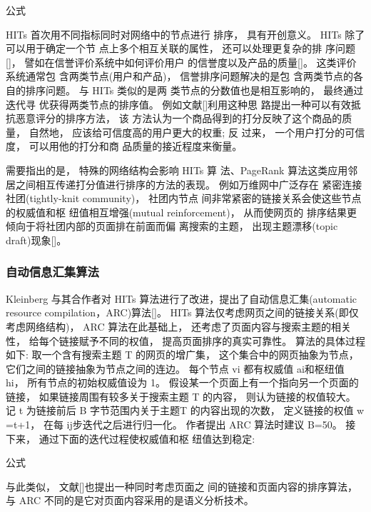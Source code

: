 				公式

				HITs 首次用不同指标同时对网络中的节点进行 排序， 具有开创意义。 HITs 除了可以用于确定一个节 点上多个相互关联的属性， 还可以处理更复杂的排 序问题[]， 譬如在信誉评价系统中如何评价用户 的信誉度以及产品的质量[]。 这类评价系统通常包 含两类节点(用户和产品)， 信誉排序问题解决的是包 含两类节点的各自的排序问题。 与 HITs 类似的是两 类节点的分数值也是相互影响的， 最终通过迭代寻 优获得两类节点的排序值。 例如文献[]利用这种思 路提出一种可以有效抵抗恶意评分的排序方法， 该 方法认为一个商品得到的打分反映了这个商品的质 量， 自然地， 应该给可信度高的用户更大的权重; 反 过来， 一个用户打分的可信度， 可以用他的打分和商 品质量的接近程度来衡量。

				需要指出的是， 特殊的网络结构会影响 HITs 算 法、PageRank 算法这类应用邻居之间相互传递打分值进行排序的方法的表现。 例如万维网中广泛存在 紧密连接社团(tightly-knit community)， 社团内节点 间非常紧密的链接关系会使这些节点的权威值和枢 纽值相互增强(mutual reinforcement)， 从而使网页的 排序结果更倾向于将社团内部的页面排在前面而偏 离搜索的主题， 出现主题漂移(topic draft)现象[]。

	\subsubsection{自动信息汇集算法}
	Kleinberg 与其合作者对 HITs 算法进行了改进，提出了自动信息汇集(automatic resource compilation，ARC)算法[]。 HITs 算法仅考虑网页之间的链接关系(即仅考虑网络结构)， ARC 算法在此基础上， 还考虑了页面内容与搜索主题的相关性， 给每个链接赋予不同的权值， 提高页面排序的真实可靠性。 算法的具体过程如下: 取一个含有搜索主题 T 的网页的增广集， 这个集合中的网页抽象为节点， 它们之间的链接抽象为节点之间的连边。 每个节点 vi 都有权威值 ai和枢纽值 hi， 所有节点的初始权威值设为 1。 假设某一个页面上有一个指向另一个页面的链接， 如果链接周围有较多关于搜索主题 T 的内容， 则认为链接的权值较大。 记 t 为链接前后 B 字节范围内关于主题T 的内容出现的次数， 定义链接的权值 w =t+1， 在每 ij步迭代之后进行归一化。 作者提出 ARC 算法时建议 B=50。 接下来， 通过下面的迭代过程使权威值和枢 纽值达到稳定:

				公式

				与此类似， 文献[]也提出一种同时考虑页面之 间的链接和页面内容的排序算法， 与 ARC 不同的是它对页面内容采用的是语义分析技术。
